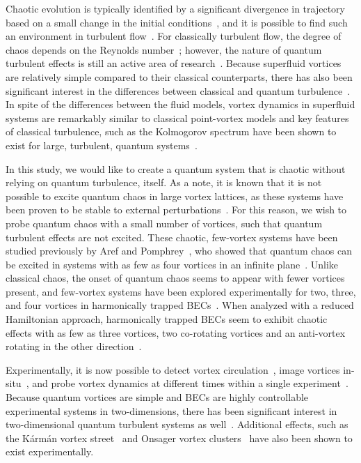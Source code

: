 Chaotic evolution is typically identified by a significant divergence in trajectory based on a small change in the initial conditions~\cite{strogatz2018}, and it is possible to find such an environment in turbulent flow~\cite{spiegel1987, biferale2005}.
For classically turbulent flow, the degree of chaos depends on the Reynolds number~\cite{berera2018}; however, the nature of quantum turbulent effects is still an active area of research~\cite{white2014}.
Because superfluid vortices are relatively simple compared to their classical counterparts, there has also been significant interest in the differences between classical and quantum turbulence~\cite{nemirovskii1995,kyriakopoulos2014,koukouloyannis2014,navarro2013}.
In spite of the differences between the fluid models, vortex dynamics in superfluid systems are remarkably similar to classical point-vortex models and key features of classical turbulence, such as the Kolmogorov spectrum have been shown to exist for large, turbulent, quantum systems~\cite{nore1997,stalp1999,araki2002,salort2010}.

In this study, we would like to create a quantum system that is chaotic without relying on quantum turbulence, itself.
As a note, it is known that it is not possible to excite quantum chaos in large vortex lattices, as these systems have been proven to be stable to external perturbations~\cite{o2017}.
For this reason, we wish to probe quantum chaos with a small number of vortices, such that quantum turbulent effects are not excited.
These chaotic, few-vortex systems have been studied previously by Aref and Pomphrey~\cite{aref1982, aref1980, aref1983}, who showed that quantum chaos can be excited in systems with as few as four vortices in an infinite plane~\cite{aref1982}.
Unlike classical chaos, the onset of quantum chaos seems to appear with fewer vortices present, and few-vortex systems have been explored experimentally for two, three, and four vortices in harmonically trapped BECs~\cite{navarro2013}.
When analyzed with a reduced Hamiltonian approach, harmonically trapped BECs seem to exhibit chaotic effects with as few as three vortices, two co-rotating vortices and an anti-vortex rotating in the other direction~\cite{kyriakopoulos2014,koukouloyannis2014}.

Experimentally, it is now possible to detect vortex circulation~\cite{seo2017}, image vortices in-situ~\cite{wilson2015}, and probe vortex dynamics at different times within a single experiment~\cite{freilich2010, serafini2017}.
Because quantum vortices are simple and BECs are highly controllable experimental systems in two-dimensions, there has been significant interest in two-dimensional quantum turbulent systems as well~\cite{neely2013,shin2004}.
Additional effects, such as the K\'arm\'an vortex street~\cite{kwon2014} and Onsager vortex clusters~\cite{gauthier2018,johnstone2018} have also been shown to exist experimentally.


